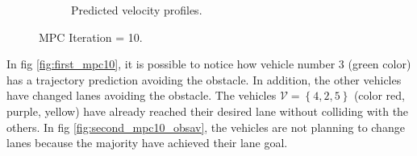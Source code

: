 \begin{figure}[H]
\begin{subfigure}[b]{0.45\textwidth}
    \caption{Predicted velocity profiles.}
    \label{fig:third}
\end{subfigure}
\label{fig:obs_mpc10}
\caption{MPC Iteration = 10.}
\end{figure}



In fig \ref{fig:first_mpc10}, it is possible to notice how vehicle number 3 (green color) has a trajectory prediction avoiding the obstacle. In addition, the other vehicles have changed lanes avoiding the obstacle. The vehicles $\mathcal{V}= \left\{ 4,2,5 \right\}$ (color red, purple, yellow) have already reached their desired lane without colliding with the others. In fig \ref{fig:second_mpc10_obsav}, the vehicles are not planning to change lanes because the majority have achieved their lane goal.


